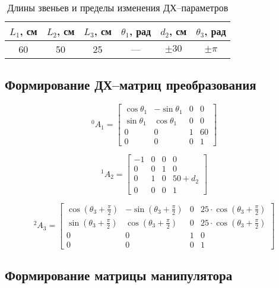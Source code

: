 \documentclass[oneside, final, 14pt]{extarticle}
\begin{document}
\begin{table}[h]
\centering
\begin{tabular}{|c|c|c|c|c|c|}
  \hline  \(L_1\), см & \(L_2\), см & \(L_3\), см & \(\theta_1\), рад & \(d_2\), см & \(\theta_3\), рад \\ \hline
  60 & 50 & 25 & --- & \(\pm 30\) & \(\pm \pi\) \\ \hline
\end{tabular}
\caption{Длины звеньев и пределы изменения ДХ--параметров}
\label{t:var-param}
\end{table}

\subsection{Формирование ДХ--матриц преобразования}

\begin{displaymath}
  {}^0A_1 = 
  \begin{bmatrix}
    \cos{\theta_1} & -\sin{\theta_1} & 0 & 0 \\
	\sin{\theta_1} & \cos{\theta_1} & 0 & 0 \\
	0 & 0 & 1 & 60 \\
	0 & 0 & 0 & 1
  \end{bmatrix}
\end{displaymath}

\begin{displaymath}
  {}^1A_2 = 
  \begin{bmatrix}
    -1 & 0 & 0 & 0 \\
	0 & 0 & 1 & 0 \\
	0 & 1 & 0 & 50+d_2 \\
	0 & 0 & 0 & 1
  \end{bmatrix}
\end{displaymath}

\begin{displaymath}
  {}^2A_3 = 
  \begin{bmatrix}
    \cos{(\theta_3+\frac{\pi}{2})} & -\sin{(\theta_3+\frac{\pi}{2})} & 0 & 25 \cdot \cos{(\theta_3+\frac{\pi}{2})} \\
	\sin{(\theta_3+\frac{\pi}{2})} & \cos{(\theta_3+\frac{\pi}{2})} & 0 & 25 \cdot \cos{(\theta_3+\frac{\pi}{2})} \\
	0 & 0 & 1 & 0 \\
	0 & 0 & 0 & 1
  \end{bmatrix}
\end{displaymath}

\subsection{Формирование матрицы манипулятора}
\end{document}
